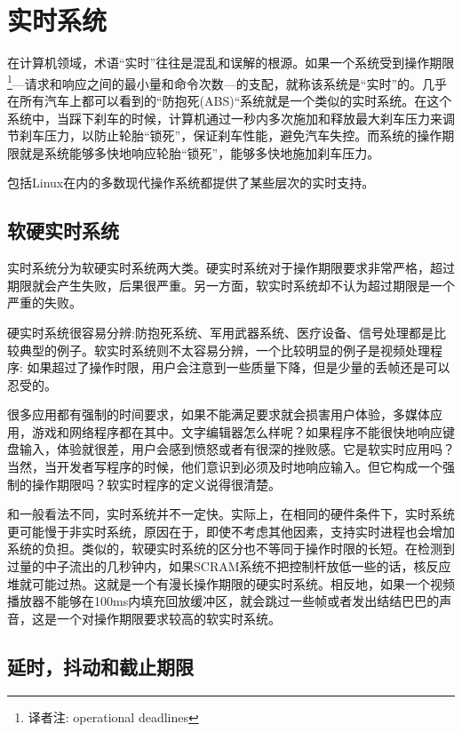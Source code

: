 \section{实时系统}

  在计算机领域，术语“实时”往往是混乱和误解的根源。如果一个系统受到操作期限\footnote[1]{译者注: operational deadlines}---请求和响应之间的最小量和命令次数---的支配，就称该系统是“实时”的。几乎在所有汽车上都可以看到的“防抱死(ABS)“系统就是一个类似的实时系统。在这个系统中，当踩下刹车的时候，计算机通过一秒内多次施加和释放最大刹车压力来调节刹车压力，以防止轮胎“锁死”，保证刹车性能，避免汽车失控。而系统的操作期限就是系统能够多快地响应轮胎“锁死”，能够多快地施加刹车压力。

  包括Linux在内的多数现代操作系统都提供了某些层次的实时支持。

\subsection{软硬实时系统}

  实时系统分为软硬实时系统两大类。硬实时系统对于操作期限要求非常严格，超过期限就会产生失败，后果很严重。另一方面，软实时系统却不认为超过期限是一个严重的失败。

  硬实时系统很容易分辨:防抱死系统、军用武器系统、医疗设备、信号处理都是比较典型的例子。软实时系统则不太容易分辨，一个比较明显的例子是视频处理程序: 如果超过了操作时限，用户会注意到一些质量下降，但是少量的丢帧还是可以忍受的。

  很多应用都有强制的时间要求，如果不能满足要求就会损害用户体验，多媒体应用，游戏和网络程序都在其中。文字编辑器怎么样呢？如果程序不能很快地响应键盘输入，体验就很差，用户会感到愤怒或者有很深的挫败感。它是软实时应用吗？当然，当开发者写程序的时候，他们意识到必须及时地响应输入。但它构成一个强制的操作期限吗？软实时程序的定义说得很清楚。

  和一般看法不同，实时系统并不一定快。实际上，在相同的硬件条件下，实时系统更可能慢于非实时系统，原因在于，即使不考虑其他因素，支持实时进程也会增加系统的负担。类似的，软硬实时系统的区分也不等同于操作时限的长短。在检测到过量的中子流出的几秒钟内，如果SCRAM系统不把控制杆放低一些的话，核反应堆就可能过热。这就是一个有漫长操作期限的硬实时系统。相反地，如果一个视频播放器不能够在100ms内填充回放缓冲区，就会跳过一些帧或者发出结结巴巴的声音，这是一个对操作期限要求较高的软实时系统。

\subsection{延时，抖动和截止期限}

